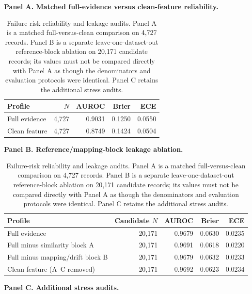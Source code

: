 \begin{table}[!ht]
\centering
\caption{Failure-risk reliability and leakage audits. Panel A is a matched full-versus-clean comparison on 4,727 records. Panel B is a separate leave-one-dataset-out reference-block ablation on 20,171 candidate records; its values must not be compared directly with Panel A as though the denominators and evaluation protocols were identical. Panel C retains the additional stress audits.}
\label{tab:s_reliability}
\scriptsize
\textbf{Panel A. Matched full-evidence versus clean-feature reliability.}

\vspace{2pt}
\begin{tabular}{lrrrr}
\toprule
Profile & $N$ & AUROC & Brier & ECE\\
\midrule
Full evidence & 4,727 & 0.9031 & 0.1250 & 0.0550\\
Clean feature & 4,727 & 0.8749 & 0.1424 & 0.0504\\
\bottomrule
\end{tabular}

\vspace{6pt}
\textbf{Panel B. Reference/mapping-block leakage ablation.}

\vspace{2pt}
\begin{tabular}{lrrrr}
\toprule
Profile & Candidate $N$ & AUROC & Brier & ECE\\
\midrule
Full evidence & 20,171 & 0.9679 & 0.0630 & 0.0235\\
Full minus similarity block A & 20,171 & 0.9691 & 0.0618 & 0.0220\\
Full minus mapping/drift block B & 20,171 & 0.9679 & 0.0632 & 0.0233\\
Clean feature (A--C removed) & 20,171 & 0.9692 & 0.0623 & 0.0234\\
\bottomrule
\end{tabular}

\vspace{6pt}
\textbf{Panel C. Additional stress audits.}

\vspace{2pt}


\end{table}

